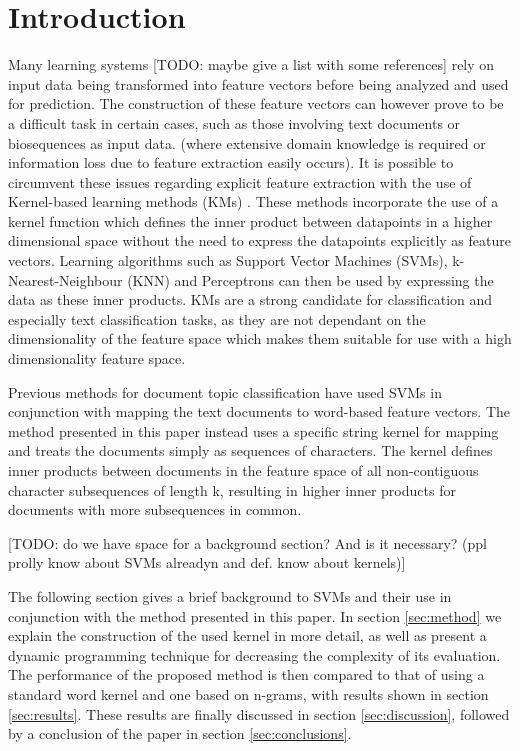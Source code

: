 \section{Introduction} \label{sec:intro}
Many learning systems [TODO: maybe give a list with some references] rely on input data being transformed into feature vectors before being analyzed and used for prediction. The construction of these feature vectors can however prove to be a difficult task in certain cases, such as those involving text documents or biosequences as input data. (where extensive domain knowledge is required or information loss due to feature extraction easily occurs).
It is possible to circumvent these issues regarding explicit feature extraction with the use of Kernel-based learning methods (KMs) \cite{Vapnik95}. These methods incorporate the use of a kernel function which defines the inner product between datapoints in a higher dimensional space without the need to express the datapoints explicitly as feature vectors. Learning algorithms such as Support Vector Machines (SVMs), k-Nearest-Neighbour (KNN) and Perceptrons can then be used by expressing the data as these inner products. KMs are a strong candidate for classification and especially text classification tasks, as they are not dependant on the dimensionality of the feature space which makes them suitable for use with a high dimensionality feature space. 

Previous methods for document topic classification \cite{Joachims1998} have used SVMs in conjunction with mapping the text documents to word-based feature vectors. The method presented in this paper instead uses a specific string kernel for mapping and treats the documents simply as sequences of characters. The kernel defines inner products between documents in the feature space of all non-contiguous character subsequences of length k, resulting in higher inner products for documents with more subsequences in common. 

[TODO: do we have space for a background section? And is it necessary? (ppl prolly know about SVMs alreadyn and def. know about kernels)]

The following section gives a brief background to SVMs and their use in conjunction with the method presented in this paper. In section \ref{sec:method} we explain the construction of the used kernel in more detail, as well as present a dynamic programming technique for decreasing the complexity of its evaluation. The performance of the proposed method is then compared to that of using a standard word kernel and one based on n-grams, with results shown in section \ref{sec:results}. These results are finally discussed in section \ref{sec:discussion}, followed by a conclusion of the paper in section \ref{sec:conclusions}.
